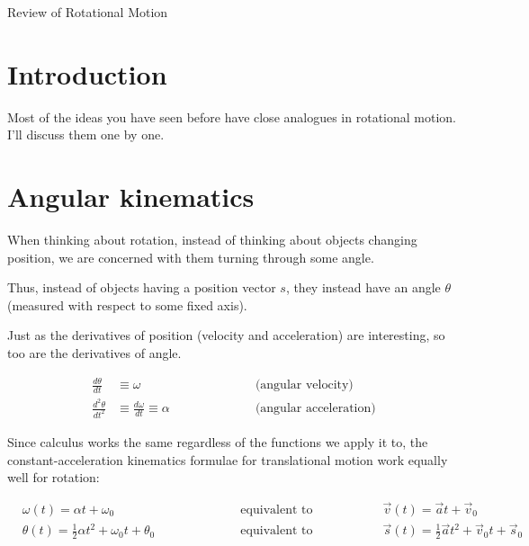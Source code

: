 \documentclass[10pt]{article}
\begin{document}
\begin{center}
	\sc \Large Review of Rotational Motion
	
\end{center}

\section{Introduction}

Most of the ideas you have seen before have close analogues in rotational motion. I'll discuss them one by one.

\section{Angular kinematics}

When thinking about rotation, instead of thinking about objects changing position, we are concerned with them turning through some angle.

Thus, instead of objects having a position vector $s$, they instead have an angle $\theta$ (measured with respect to some fixed axis).

Just as the derivatives of position (velocity and acceleration) are interesting, so too are the derivatives of angle.

\begin{align*}
\frac{d\theta}{dt} &\equiv \omega \hspace{1in} &\text{(angular velocity)} \\
\frac{d^2\theta}{dt^2} &\equiv \frac{d\omega}{dt} \equiv \alpha \hspace{1in} &\text{(angular acceleration)} 
\end{align*}

Since calculus works the same regardless of the functions we apply it to, the constant-acceleration kinematics formulae for translational motion work equally well for rotation:

\begin{align*}
&\omega(t) = \alpha t + \omega_0 \hspace{1in}& \text{equivalent to} \hspace {1in} & \vec v(t) = \vec a t + \vec v_0 \\
&\theta(t) = \frac{1}{2}\alpha t^2 + \omega_0 t + \theta_0 \hspace{1in}& \text{equivalent to} \hspace{1in}&\vec s(t) = \frac{1}{2}\vec at^2 + \vec v_0 t + \vec s_0 
\end{align*}
\end{document}
